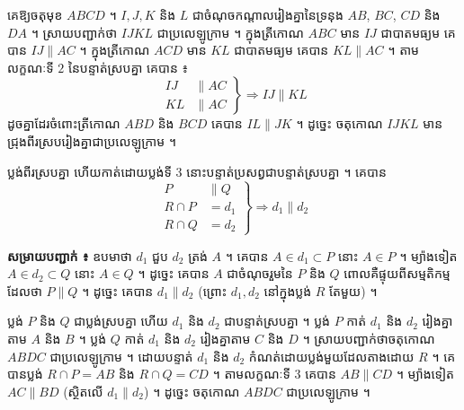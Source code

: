 \begin{example}[លំហាត់គំរូ ១]
គេឱ្យចតុមុខ $ABCD$ ។ $I, J, K$ និង $L$ ជាចំណុចកណ្ដាលរៀងគ្នានៃទ្រនុង $AB$, $BC$, $CD$ និង $DA$ ។ ស្រាយបញ្ជាក់ថា $IJKL$ ជាប្រលេឡូក្រាម ។
\ans
ក្នុងត្រីកោណ $ABC$ មាន $IJ$ ជាបាតមធ្យម គេបាន $IJ \parallel AC$ ។ ក្នុងត្រីកោណ $ACD$ មាន $KL$ ជាបាតមធ្យម គេបាន $KL \parallel AC$ ។ តាមលក្ខណៈទី $2$ នៃបន្ទាត់ស្របគ្នា គេបាន ៖
\[
\left.\begin{aligned} IJ &\parallel AC\\ KL &\parallel AC \end{aligned}\right\} \Rightarrow IJ \parallel KL
\]
ដូចគ្នាដែរចំពោះត្រីកោណ $ABD$ និង $BCD$ គេបាន $IL \parallel JK$ ។ ដូច្នេះ ចតុកោណ $IJKL$ មានជ្រុងពីរស្របរៀងគ្នាជាប្រលេឡូក្រាម ។
\begin{center}
\end{center}
\end{example}

\begin{theorem}[លក្ខណៈទី ៣]
ប្លង់ពីរស្របគ្នា ហើយកាត់ដោយប្លង់ទី $3$ នោះបន្ទាត់ប្រសព្វជាបន្ទាត់ស្របគ្នា ។ គេបាន
\[
\left.\begin{aligned} P &\parallel Q\\ R \cap P &= d_1\\ R \cap Q &= d_2 \end{aligned}\right\} \Rightarrow d_1 \parallel d_2
\]
\end{theorem}
\textbf{សម្រាយបញ្ជាក់ ៖} ឧបមាថា $d_1$ ជួប $d_2$ ត្រង់ $A$ ។ គេបាន $A \in d_1 \subset P$ នោះ $A \in P$ ។ ម្យ៉ាងទៀត $A \in d_2 \subset Q$ នោះ $A \in Q$ ។ ដូច្នេះ គេបាន $A$ ជាចំណុចរួមនៃ $P$ និង $Q$ ពោលគឺផ្ទុយពីសម្មតិកម្មដែលថា $P \parallel Q$ ។ ដូច្នេះ គេបាន $d_1 \parallel d_2$ (ព្រោះ $d_1, d_2$ នៅក្នុងប្លង់ $R$ តែមួយ) ។

\begin{example}[លំហាត់គំរូ ២]
ប្លង់ $P$ និង $Q$ ជាប្លង់ស្របគ្នា ហើយ $d_1$ និង $d_2$ ជាបន្ទាត់ស្របគ្នា ។ ប្លង់ $P$ កាត់ $d_1$ និង $d_2$ រៀងគ្នាតាម $A$ និង $B$ ។ ប្លង់ $Q$ កាត់ $d_1$ និង $d_2$ រៀងគ្នាតាម $C$ និង $D$ ។ ស្រាយបញ្ជាក់ថាចតុកោណ $ABDC$ ជាប្រលេឡូក្រាម ។
\ans
ដោយបន្ទាត់ $d_1$ និង $d_2$ កំណត់ដោយប្លង់មួយដែលតាងដោយ $R$ ។ គេបានប្លង់ $R \cap P = AB$ និង $R \cap Q = CD$ ។ តាមលក្ខណៈទី $3$ គេបាន $AB \parallel CD$ ។ ម្យ៉ាងទៀត $AC \parallel BD$ (ស្ថិតលើ $d_1 \parallel d_2$) ។ ដូច្នេះ ចតុកោណ $ABDC$ ជាប្រលេឡូក្រាម ។
\end{example}

